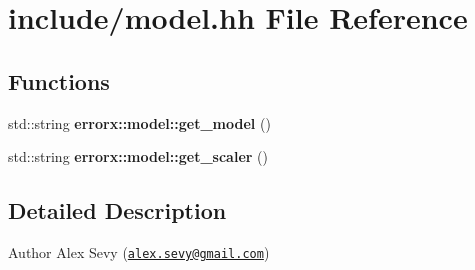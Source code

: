 \hypertarget{model_8hh}{}\section{include/model.hh File Reference}
\label{model_8hh}
\subsection*{Functions}
\begin{DoxyCompactItemize}
\item 
\mbox{\label{model_8hh_a50de94c3d14f50f340eff3757ee3575c}} 
std\+::string {\bfseries errorx\+::model\+::get\+\_\+model} ()
\item 
\mbox{\label{model_8hh_a776c748bb3315e8bcfb0119bedf767c0}} 
std\+::string {\bfseries errorx\+::model\+::get\+\_\+scaler} ()
\end{DoxyCompactItemize}


\subsection{Detailed Description}
\begin{DoxyAuthor}{Author}
Alex Sevy (\href{mailto:alex.sevy@gmail.com}{\tt alex.\+sevy@gmail.\+com}) 
\end{DoxyAuthor}
